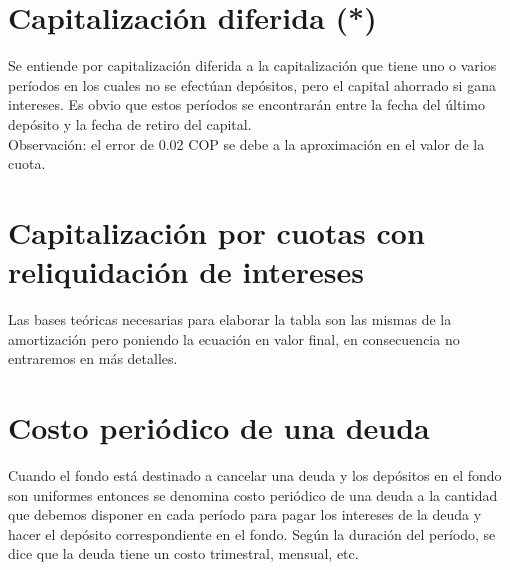	
	\section{Capitalización diferida (*)}
	Se entiende por capitalización diferida a la capitalización que tiene uno o varios períodos en los cuales no se efectúan depósitos, pero el capital ahorrado si gana intereses. Es obvio que estos períodos se encontrarán entre la fecha del último depósito y la fecha de retiro del capital. \\
	
	
	
	
	
	Observación: el error de  0.02 COP se debe a la aproximación en el valor de la cuota.\\
	
	\section{Capitalización por cuotas con reliquidación de intereses}
	
	Las bases teóricas necesarias para elaborar la tabla son las mismas de la amortización pero poniendo la ecuación en valor final, en consecuencia no entraremos en más detalles.\\
	
	
	
	
	
	
	
	
	\section{Costo periódico de una deuda}
	
	Cuando el fondo está destinado a cancelar una deuda y los depósitos en el fondo son uniformes entonces se denomina costo periódico de una deuda a la cantidad que debemos disponer en cada período para pagar los intereses de la deuda y hacer el depósito correspondiente en el fondo. Según la duración del período, se dice que la deuda tiene un costo trimestral, mensual, etc.\\
	
